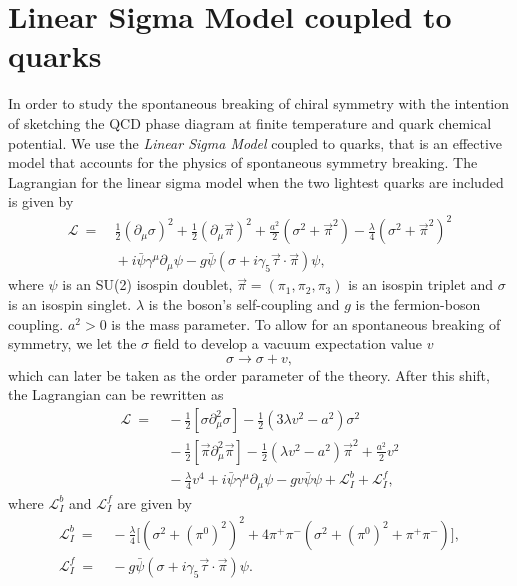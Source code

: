 \documentclass[%
 reprint,
showpacs,preprintnumbers,
 amsmath,amssymb,
onecolumn]{revtex4}
\begin{document}
\section{\label{sec:LSMq}Linear Sigma Model coupled to quarks}
In order to study the spontaneous breaking of chiral symmetry with the intention of sketching the QCD phase diagram at finite temperature and quark chemical potential. We use the \textit{Linear Sigma Model} coupled to quarks, that is an effective model that accounts for the physics of spontaneous symmetry breaking. The Lagrangian for the linear sigma model when the two lightest quarks are included is given by
\begin{align}
   \mathcal{L}\ =&\ \frac{1}{2}(\partial_\mu \sigma)^2  + \frac{1}{2}(\partial_\mu \vec{\pi})^2 + \frac{a^2}{2} (\sigma^2 + \vec{\pi}^2) - \frac{\lambda}{4} (\sigma^2 + \vec{\pi}^2)^2 \nonumber \\
   &\ + i \bar{\psi} \gamma^\mu \partial_\mu \psi -g\bar{\psi} (\sigma + i \gamma_5 \vec{\tau} \cdot \vec{\pi} )\psi ,
\label{lagrangian}
\end{align}
where $\psi$ is an SU(2) isospin doublet, $\vec{\pi}=(\pi_1, \pi_2, \pi_3 )$ is an isospin triplet and $\sigma$ is an isospin singlet. $\lambda$ is the boson's self-coupling and $g$ is the fermion-boson coupling. $a^2>0$ is the mass parameter.  To allow for an spontaneous breaking of symmetry, we let the $\sigma$ field to develop a vacuum expectation value $v$
\begin{equation}
   \sigma \rightarrow \sigma + v,
\label{shift}
\end{equation}
which can later be taken as the order parameter of the theory.  After this shift, the Lagrangian can be rewritten as
\begin{align}
   {\mathcal{L}}\ = &\ -\frac{1}{2}[\sigma \partial_{\mu}^{2}\sigma]-\frac{1}{2}\left(3\lambda v^{2}-a^{2} \right)\sigma^{2}\nonumber \\
   &\ -\frac{1}{2}[\vec{\pi}\partial_{\mu}^{2}\vec{\pi}]-\frac{1}{2}\left(\lambda v^{2}- a^2 \right)\vec{\pi}^{2}+\frac{a^{2}}{2}v^{2}\nonumber \\
  &\ -\frac{\lambda}{4}v^{4} + i \bar{\psi} \gamma^\mu \partial_\mu \psi -gv \bar{\psi}\psi + {\mathcal{L}}_{I}^b + {\mathcal{L}}_{I}^f,
  \label{lagranreal}
\end{align}
where ${\mathcal{L}}_{I}^b$ and  ${\mathcal{L}}_{I}^f$ are given by
\begin{align}
  {\mathcal{L}}_{I}^b\ = &\ -\frac{\lambda}{4}\Big[(\sigma^2 + (\pi^0)^2)^2 + 4\pi^+\pi^-(\sigma^2 + (\pi^0)^2 + \pi^+\pi^-)\Big],\nonumber \\
  {\mathcal{L}}_{I}^f\ =&\ -g\bar{\psi} (\sigma + i \gamma_5 \vec{\tau} \cdot \vec{\pi} )\psi.
  \label{lagranint}
\end{align}
\end{document}
